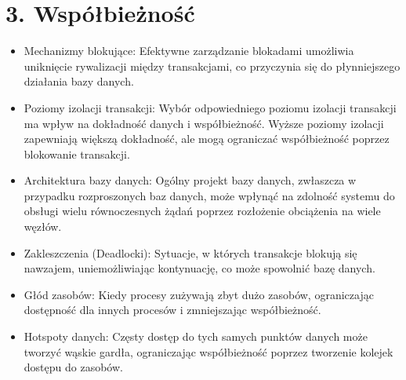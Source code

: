 \documentclass[letterpaper,10pt,polish]{sphinxmanual}
\begin{document}
\section{3. Współbieżność}
\label{\detokenize{rozdzialy/rozdzial3:wspolbieznosc}}\begin{description}
\begin{itemize}
\item {} 
\sphinxAtStartPar
Mechanizmy blokujące: Efektywne zarządzanie blokadami umożliwia uniknięcie rywalizacji między transakcjami, co przyczynia się do płynniejszego działania bazy danych.

\item {} 
\sphinxAtStartPar
Poziomy izolacji transakcji: Wybór odpowiedniego poziomu izolacji transakcji ma wpływ na dokładność danych i współbieżność. Wyższe poziomy izolacji zapewniają większą dokładność, ale mogą ograniczać współbieżność poprzez blokowanie transakcji.

\item {} 
\sphinxAtStartPar
Architektura bazy danych: Ogólny projekt bazy danych, zwłaszcza w przypadku rozproszonych baz danych, może wpłynąć na zdolność systemu do obsługi wielu równoczesnych żądań poprzez rozłożenie obciążenia na wiele węzłów.

\end{itemize}

\begin{itemize}
\item {} 
\sphinxAtStartPar
Zakleszczenia (Deadlocki): Sytuacje, w których transakcje blokują się nawzajem, uniemożliwiając kontynuację, co może spowolnić bazę danych.

\item {} 
\sphinxAtStartPar
Głód zasobów: Kiedy procesy zużywają zbyt dużo zasobów, ograniczając dostępność dla innych procesów i zmniejszając współbieżność.

\item {} 
\sphinxAtStartPar
Hotspoty danych: Częsty dostęp do tych samych punktów danych może tworzyć wąskie gardła, ograniczając współbieżność poprzez tworzenie kolejek dostępu do zasobów.

\end{itemize}

\end{description}
\end{document}
